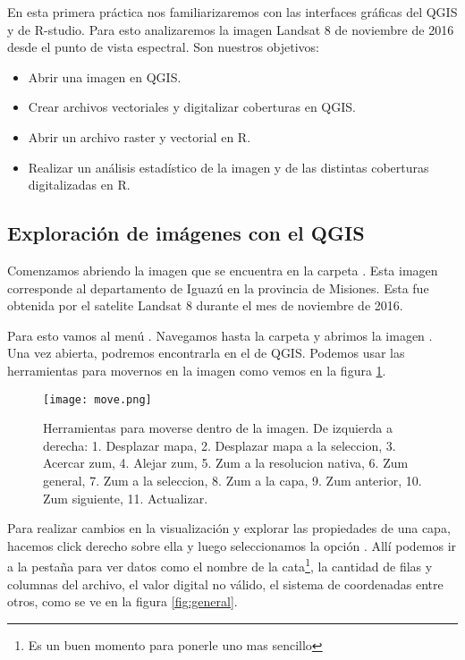 En esta primera práctica nos familiarizaremos con las interfaces gráficas del
QGIS y de R-studio. Para esto analizaremos la imagen Landsat 8 de noviembre de
2016 desde el punto de vista espectral. Son nuestros objetivos:

\begin{itemize}
    \item Abrir una imagen en QGIS.
    \item Crear archivos vectoriales y digitalizar coberturas en QGIS.
    \item Abrir un archivo raster y vectorial en R.
    \item Realizar un análisis estad\'istico de la imagen y de las
        distintas coberturas digitalizadas en R.
\end{itemize}
\subsection{Exploración de im\'agenes con el QGIS}

Comenzamos abriendo la imagen  que se encuentra
en la carpeta . Esta imagen  corresponde al
departamento de Iguaz\'u en la provincia de Misiones. Esta fue obtenida por
el satelite Landsat 8 durante el mes de noviembre de 2016.

Para esto vamos al menú . Navegamos
hasta la carpeta  y abrimos la imagen
. Una vez abierta, podremos encontrarla
en el  de QGIS. Podemos usar las herramientas para
movernos en la imagen como vemos en la figura \ref{fig:move}.

\begin{figure}[h!]
\begin{center}
    \texttt{[image: move.png]}
\end{center}
\caption{Herramientas para moverse dentro de la imagen. De izquierda a derecha:
    1. Desplazar mapa, 2. Desplazar mapa a la seleccion, 3. Acercar zum, 4.
    Alejar zum, 5. Zum a la resolucion nativa, 6. Zum general, 7. Zum a la
    seleccion, 8. Zum a la capa, 9. Zum anterior, 10. Zum siguiente, 11.
    Actualizar.}
\label{fig:move}
\end{figure}

Para realizar cambios en la visualizaci\'on y explorar las propiedades de una
capa, hacemos click derecho sobre ella y luego seleccionamos la opci\'on
. All\'i podemos ir a la pestaña
 para ver datos como el nombre de la cata\footnote{Es un buen
momento para ponerle uno mas sencillo}, la cantidad de filas y columnas del
archivo, el valor digital no v\'alido, el sistema de coordenadas
entre otros, como se ve en la figura \ref{fig:general}.

